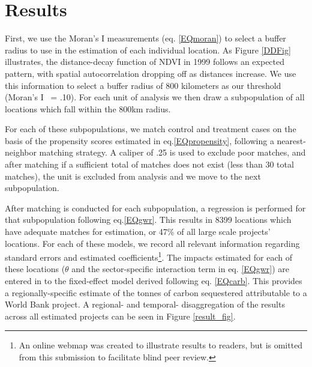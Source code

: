 \documentclass{article}\usepackage[]{graphicx}\usepackage[]{color}
\newenvironment{knitrout}{}{}  %
\begin{document}
\begin{knitrout}
\section{Results}
First, we use the Moran's I measurements (eq. \ref{EQmoran}) to select a buffer radius to use in the estimation of each individual location.
As Figure \ref{DDFig} illustrates, the distance-decay function of NDVI in 1999 follows an expected pattern, with spatial autocorrelation dropping off as distances increase.  
We use this information to select a buffer radius of 800 kilometers as our threshold (Moran's I ~= .10).  
For each unit of analysis we then draw a subpopulation of all locations which fall within the 800km radius.
\par
For each of these subpopulations, we match control and treatment cases on the basis of the propensity scores estimated in eq.\ref{EQpropensity}, following a nearest-neighbor matching strategy.  
A caliper of .25 is used to exclude poor matches, and after matching if a sufficient total of matches does not exist (less than 30 total matches), the unit is excluded from analysis and we move to the next subpopulation. 
\par
 
After matching is conducted for each subpopulation, a regression is performed for that subpopulation following eq.\ref{EQgwr}.  
This results in 8399 locations which have adequate matches for estimation, or 47\% of all large scale projects' locations. 
For each of these models, we record all relevant information regarding standard errors and estimated coefficients\footnote{An online webmap was created to illustrate results to readers, but is omitted from this submission to facilitate blind peer review.}.  
The impacts estimated for each of these locations (\begin{math}\theta\end{math} and the sector-specific interaction term in eq. \ref{EQgwr}) are entered in to the fixed-effect model derived following eq. \ref{EQcarb}.
This provides a regionally-specific estimate of the tonnes of carbon sequestered attributable to a World Bank project.
A regional- and temporal- disaggregation of the results across all estimated projects can be seen in Figure \ref{result_fig}.


\end{knitrout}
\end{document}
